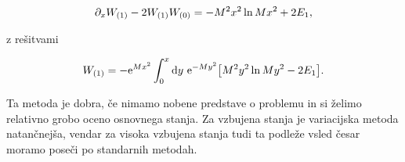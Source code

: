 \begin{equation}
	\partial_x W_{(1)} - 2W_{(1)}W_{(0)} = - M^2x^2 \ln Mx^2 + 2E_1,
\end{equation}

z re\v sitvami

\begin{equation}
	W_{(1)} = -\text{e}^{Mx^2} \int_0^x \text{d} y\ \text{e}^{-My^2}\big[M^2y^2 \ln My^2 - 2E_1\big].
\end{equation}

Ta metoda je dobra, \v ce nimamo nobene predstave o problemu in si \v zelimo relativno grobo oceno osnovnega stanja. Za vzbujena stanja
je variacijska metoda natan\v cnej\v sa, vendar za visoka vzbujena stanja tudi ta podle\v ze vsled \v cesar moramo pose\v ci po
standarnih metodah.

